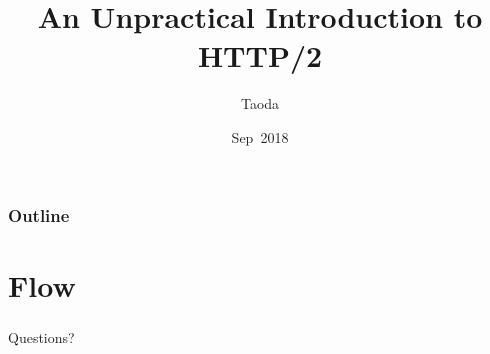 \documentclass[lualatex]{beamer}
\title[HTTP2]{An Unpractical Introduction to HTTP/2}
\author{Taoda}
\institute{YITU tech}
\date{Sep\ 2018}
\begin{document}
\begin{frame}
\titlepage
\end{frame}

\begin{frame}
  \frametitle{Outline}
  \tableofcontents
\end{frame}

\section{Flow}

\begin{frame}
  \frametitle{}
  \begin{center}
    \Huge
    Questions?
  \end{center}
\end{frame}
\end{document}
